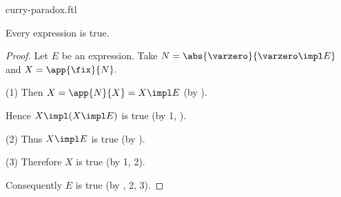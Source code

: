\documentclass{article}
\begin{document}
\begin{smodule}{curry-paradox.ftl}
\begin{forthel}
  \begin{theorem*}[title=Curry's Paradox,id=curry_paradox]
    Every expression is true.
  \end{theorem*}
  \begin{proof}
    Let $E$ be an expression.
    Take $N = \abs{\varzero}{\varzero \impl E}$ and $X = \app{\fix}{N}.$

    (1) Then $X = \app{N}{X} = X \impl E$ (by ).

    Hence $X \impl (X \impl E)$ is true (by 1, ).

    (2) Thus $X \impl E$ is true (by ).

    (3) Therefore $X$ is true (by 1, 2).

    Consequently $E$ is true (by , 2, 3).
  \end{proof}
\end{forthel}

\printbibliography
{}
\end{smodule}
\end{document}
